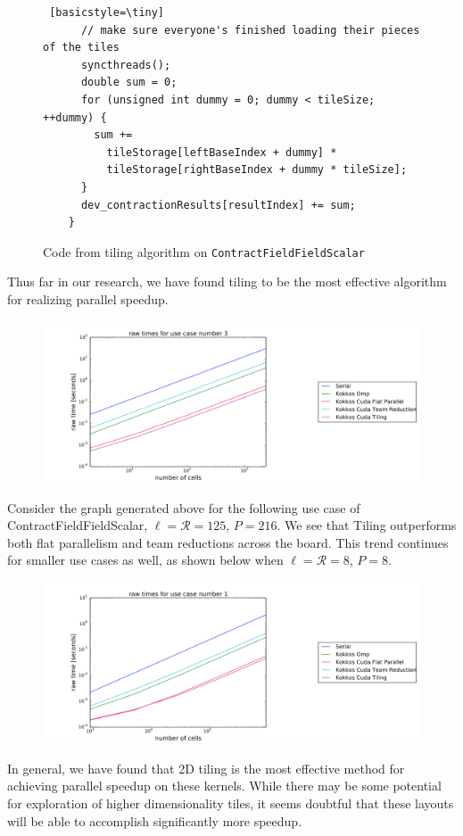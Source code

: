\begin{figure}
\begin{lstlisting} [basicstyle=\tiny]
      // make sure everyone's finished loading their pieces of the tiles
      syncthreads();
      double sum = 0;
      for (unsigned int dummy = 0; dummy < tileSize; ++dummy) {
        sum +=
          tileStorage[leftBaseIndex + dummy] *
          tileStorage[rightBaseIndex + dummy * tileSize];
      }
      dev_contractionResults[resultIndex] += sum;
    }

 \end{lstlisting}
\caption{Code from tiling algorithm on \texttt{ContractFieldFieldScalar}
\label{lst:ContractFieldFieldScalarTiling}} 
\end{figure}


Thus far in our research, we have found tiling to be the most effective algorithm for realizing parallel speedup. 

\begin{figure}
    \centering
\includegraphics[scale = .2]{tilinguc1}
\end{figure}
Consider the graph generated above for the following use case of ContractFieldFieldScalar, $\ell = \mathcal{R} = 125$, $P = 216$. We see that Tiling outperforms both flat parallelism and team reductions across the board. This trend continues for smaller use cases as well, as shown below when $\ell = \mathcal{R} = 8$, $P = 8$.

\begin{figure}[h]
    \centering
\includegraphics[scale = .2]{tilinguc2}
\end{figure}

In general, we have found that 2D tiling is the most effective method for achieving parallel speedup on these kernels. While there may be some potential for exploration of higher dimensionality tiles, it seems doubtful that these layouts will be able to accomplish significantly more speedup. 
